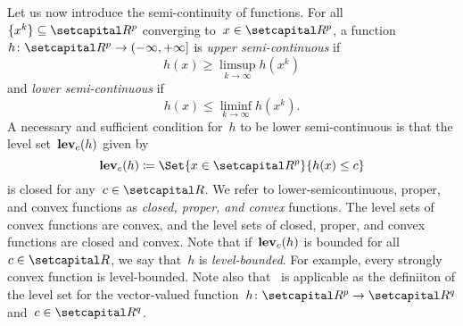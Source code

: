 \documentclass[../main]{subfiles}
\begin{document}
Let us now introduce the semi-continuity of functions.
For all~$\set{x^k} \subseteq \setR^p$ converging to~$x \in \setR^p$, a function~$h \colon \setR^p \to (-\infty, +\infty]$ is \emph{upper semi-continuous} if
\begin{equation}
    h(x) \ge \limsup_{k \to \infty} h(x^k) 
\end{equation} 
and \emph{lower semi-continuous} if
\begin{equation}
    h(x) \le \liminf_{k \to \infty} h(x^k) 
.\end{equation} 
A necessary and sufficient condition for~$h$ to be lower semi-continuous is that the level set~$\operatorname{\mathbf{lev}}_c(h)$ given by
\begin{equation} \label{eq:level}
    \level_c(h) \coloneqq \Set{x \in \setR^p}{h(x) \le c}
\end{equation} 
is closed for any~$c \in \setR$.
We refer to lower-semicontinuous, proper, and convex functions as \emph{closed, proper, and convex} functions.
The level sets of convex functions are convex, and the level sets of closed, proper, and convex functions are closed and convex.
Note that if~$\operatorname{\mathbf{lev}}_c(h)$ is bounded for all~$c \in \setR$, we say that~$h$ is \emph{level-bounded}.
For example, every strongly convex function is level-bounded.
Note also that~ is applicable as the definiiton of the level set for the vector-valued function~$h \colon \setR^p \to \setR^q$ and~$c \in \setR^q$.
\end{document}
